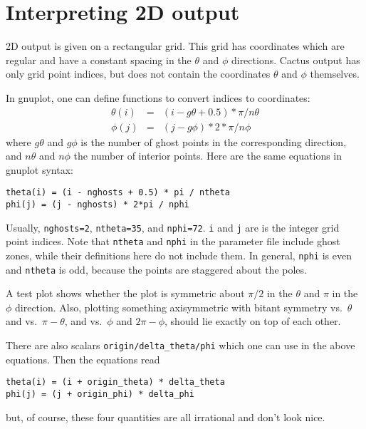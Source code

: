 \section{Interpreting 2D output}

2D output is given on a rectangular grid.  This grid has coordinates
which are regular and have a constant spacing in the $\theta$ and
$\phi$ directions.  Cactus output has only grid point indices, but
does not contain the coordinates $\theta$ and $\phi$ themselves.

In gnuplot, one can define functions to convert indices to
coordinates:
\begin{eqnarray}
  \theta(i) & = & (i - g\theta + 0.5) * \pi   / n\theta
  \\
  \phi(j)   & = & (j - g\phi        ) * 2*\pi / n\phi
\end{eqnarray}
where $g\theta$ and $g\phi$ is the number of ghost points in the
corresponding direction, and $n\theta$ and $n\phi$ the number of
interior points.  Here are the same equations in gnuplot syntax:
\begin{verbatim}
theta(i) = (i - nghosts + 0.5) * pi / ntheta
phi(j) = (j - nghosts) * 2*pi / nphi
\end{verbatim}

Usually, \verb|nghosts=2|, \verb|ntheta=35|, and \verb|nphi=72|.
\verb|i| and \verb|j| are is the integer grid point indices.  Note
that \verb|ntheta| and \verb|nphi| in the parameter file include ghost
zones, while their definitions here do not include them.  In general,
\verb|nphi| is even and \verb|ntheta| is odd, because the points are
staggered about the poles.

A test plot shows whether the plot is symmetric about $\pi/2$ in the
$\theta$ and $\pi$ in the $\phi$ direction.  Also, plotting something
axisymmetric with bitant symmetry vs.\ $\theta$ and vs.\ $\pi-\theta$,
and vs.\ $\phi$ and $2\pi-\phi$, should lie exactly on top of each
other.

There are also scalars \verb|origin/delta_theta/phi| which one can use
in the above equations.  Then the equations read
\begin{verbatim}
theta(i) = (i + origin_theta) * delta_theta
phi(j) = (j + origin_phi) * delta_phi
\end{verbatim}
but, of course, these four quantities are all irrational and don't
look nice.



